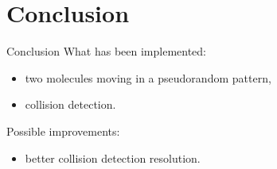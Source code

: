 \documentclass[aspectratio=169, 11pt, hyperref={unicode}]{beamer}
\begin{document}
\section{Conclusion}
\begin{frame}{Conclusion}
    What has been implemented:
	\begin{itemize}
        \item two molecules moving in a pseudorandom pattern,
        \item collision detection.
    \end{itemize}
    Possible improvements:
    \begin{itemize}
        \item better collision detection resolution.
    \end{itemize}
\end{frame}

\end{document}
